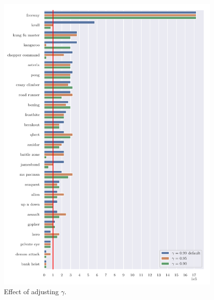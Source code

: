 \begin{figure}
\centering
\includegraphics[width=0.9\columnwidth]{figures/graph_Effect_of_adjusting_Gamma.pdf}
\caption{Effect of adjusting $\gamma$.} 
\label{fig:adj_gamma}
\end{figure}

